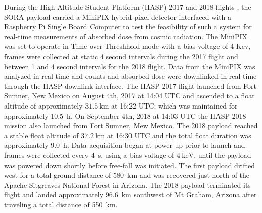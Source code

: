 During the High Altitude Student Platform (HASP) 2017 and 2018 flights \cite{hasp}, the SORA payload carried a MiniPIX hybrid pixel detector interfaced with a Raspberry Pi Single Board Computer to test the feasibility of such a system for real-time measurements of absorbed dose from cosmic radiation. The MiniPIX was set to operate in Time over Threshhold mode with a bias voltage of 4 Kev, frames were collected at static 4 second intervals during the 2017 flight and between 1 and 4 second intervals for the 2018 flight. Data from the MiniPIX was analyzed in real time and counts and absorbed dose were downlinked in real time through the HASP downlink interface. 
The HASP 2017 flight launched from Fort Sumner, New Mexico on August 4th, 2017 at 14:04 UTC and ascended to a float altitude of approximately $\SI{31.5}{\kilo\meter}$ at 16:22 UTC; which was maintained for approximately \SI{10.5}{\hour}. On September 4th, 2018 at 14:03 UTC the HASP 2018 mission also launched from Fort Sumner, Mew Mexico.  The 2018 payload reached a stable float altitude of $\SI{37.2}{\kilo\meter}$ at 16:30 UTC and the total float duration was approximately \SI{9.0}{\hour}.
Data acquisition began at power up prior to launch and frames were collected every \SI{4}{\second}, using a bias voltage of $\SI{4}{\kilo\electronvolt}$, until the payload was powered down shortly before free-fall was initiated. The first payload drifted west for a total ground distance of \SI{580}{\kilo\meter} and was recovered just north of the Apache-Sitgreaves National Forest in Arizona. The 2018 payload terminated its flight and landed approximately \SI{96.6}{\kilo\meter} southwest of Mt Graham, Arizona after traveling a total distance of \SI{550}{\kilo\meter}.

